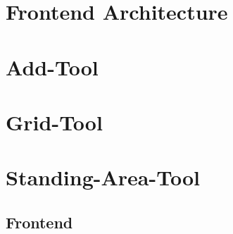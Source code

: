 \section{Frontend Architecture}


\section{Add-Tool}


\section{Grid-Tool}
\label{sec:grid-tool}

\section{Standing-Area-Tool}

\subsection{Frontend}
